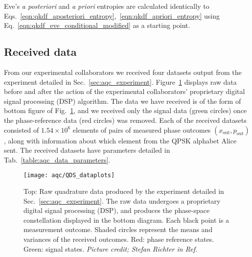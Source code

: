 Eve's \emph{a posteriori} and \emph{a priori} entropies are calculated identically to Eqs.~\ref{eqn:qkdf_aposteriori_entropy},~\ref{eqn:qkdf_apriori_entropy} using Eq.~\ref{eqn:qkdf_eve_conditional_modified} as a starting point.


\clearpage
\subsection{Received data}\label{sec:aqc_received_data}

From our experimental collaborators we received four datasets output from the experiment detailed in Sec.~\ref{sec:aqc_experiment}. Figure~\ref{fig:aqc_dataplots_stefan} displays raw data before and after the action of the experimental collaborators' proprietary digital signal processing (DSP) algorithm. The data we have received is of the form of bottom figure of Fig.~\ref{fig:aqc_dataplots_stefan}, and we received only the signal data (green circles) once the phase-reference data (red circles) was removed. Each of the received datasets consisted of $1.54\times10^6$ elements of pairs of measured phase outcomes $\left(x_{\text{out}}, p_{\text{out}}\right)$, along with information about which element from the QPSK alphabet Alice sent. The received datasets have parameters detailed in Tab.~\ref{table:aqc_data_parameters}.

\begin{figure}[htp]
\centering
\texttt{[image: aqc/QDS\_dataplots]}
\caption{\label{fig:aqc_dataplots_stefan} Top: Raw quadrature data produced by the experiment detailed in Sec.~\ref{sec:aqc_experiment}. The raw data undergoes a proprietary digital signal processing (DSP), and produces the phase-space constellation displayed in the bottom diagram. Each black point is a measurement outcome. Shaded circles represent the means and variances of the received outcomes. Red: phase reference states. Green: signal states. \emph{Picture credit; Stefan Richter in Ref.~\cite{Richter2020}}}
\end{figure}

